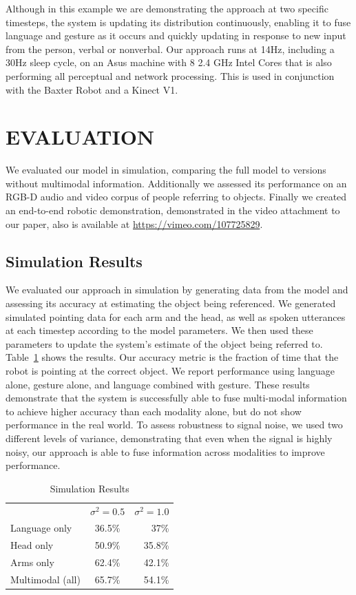\documentclass[graybox]{svmult}
\begin{document}
Although in this example we are demonstrating the approach at two
specific timesteps, the system is updating its distribution
continuously, enabling it to fuse language and gesture as it occurs
and quickly updating in response to new input from the person, verbal
or nonverbal.  Our approach runs at 14Hz, including a 30Hz sleep
cycle, on an Asus machine with 8 2.4 GHz Intel Cores that is also
performing all perceptual and network processing. This is used in conjunction with the Baxter Robot and a Kinect V1.

\section{EVALUATION}

We evaluated our model in simulation, comparing the full model to
versions without multimodal information.  Additionally we assessed its
performance on an RGB-D audio and video corpus of people referring to
objects.  Finally we created an end-to-end robotic demonstration,
demonstrated in the video attachment to our paper, also is available
at \url{https://vimeo.com/107725829}.

\subsection{Simulation Results}

We evaluated our approach in simulation by generating data from the
model and assessing its accuracy at estimating the object being
referenced.  We generated simulated pointing data for each arm and the
head, as well as spoken utterances at each timestep according to the
model parameters.  We then used these parameters to update the
system's estimate of the object being referred to.
Table~\ref{table:sim_results} shows the results.  Our accuracy metric
is the fraction of time that the robot is pointing at the correct
object.  We report performance using language alone, gesture alone,
and language combined with gesture.  These results demonstrate that
the system is successfully able to fuse multi-modal information to
achieve higher accuracy than each modality alone, but do not show
performance in the real world.  To assess robustness to signal noise,
we used two different levels of variance, demonstrating that even when
the signal is highly noisy, our approach is able to fuse information
across modalities to improve performance.

\begin{table}
\centering
\caption{Simulation Results\label{table:sim_results}}
\begin{tabular}{lcr}
\toprule
& $\sigma^2 = 0.5$ & $\sigma^2 = 1.0$\\
Language only &  36.5\% & 37\%\\
Head only & 50.9\% & 35.8\%\\
Arms only & 62.4\% & 42.1\%\\
Multimodal (all)&  65.7\% & 54.1\%\\
\bottomrule
\end{tabular}
\end{table}
\end{document}
